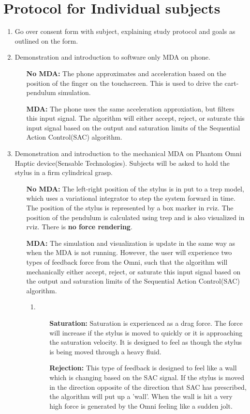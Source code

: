 \documentclass[11pt]{article}
\begin{document}
\section{Protocol for Individual subjects}
\begin{enumerate}
\item Go over consent form with subject, explaining study protocol and goals as outlined on the form.
\item Demonstration and introduction to software only MDA on phone.
	\begin{enumerate}
	\item[\textbf{No MDA:}] The phone approximates and acceleration based on the position of the finger on the touchscreen. This is used to drive the cart-pendulum simulation.
	\item[\textbf{MDA:}] The phone uses the same acceleration approxiation, but filters this input signal. The algorithm will either accept, reject, or saturate this input signal based on the output and saturation limits of the Sequential Action Control(SAC) algorithm. 
	\end{enumerate}
\item Demonstration and introduction to the mechanical MDA on Phantom Omni Haptic device(Sensable Technologies). Subjects will be asked to hold the stylus in a firm cylindrical grasp.
	\begin{enumerate}
	\item[\textbf{No MDA:}] The left-right position of the stylus is in put to a trep model, which uses a variational integrator to step the system forward in time. The position of the stylus is represented by a box marker in rviz. The position of the pendulum is calculated using trep and is also visualized in rviz. There is \textbf{no force rendering}.
	\item[\textbf{MDA:}] The simulation and visualization is update in the same way as when the MDA is not running. However, the user will experience two types of feedback force from the Omni, such that the algorithm will mechanically either accept, reject, or saturate this input signal based on the output and saturation limits of the Sequential Action Control(SAC) algorithm. 
		\begin{enumerate}
			\item \begin{enumerate}
			\item[\textbf{Saturation:}] Saturation is experienced as a drag force. The force will increase   if the stylus is moved to quickly or it is approaching the saturation velocity. It is designed to feel as though the stylus is being moved through a heavy fluid.
			\item[\textbf{Rejection:}] This type of feedback is designed to feel like a wall which is changing based on the SAC signal. If the stylus is moved in the direction opposite of the direction that SAC has prescribed, the algorithm will put up a 'wall'. When the wall is hit a very high force is generated by the Omni feeling like a sudden jolt.
			\end{enumerate}
		\end{enumerate}		  
	\end{enumerate}
	

\end{enumerate}
\end{document}
